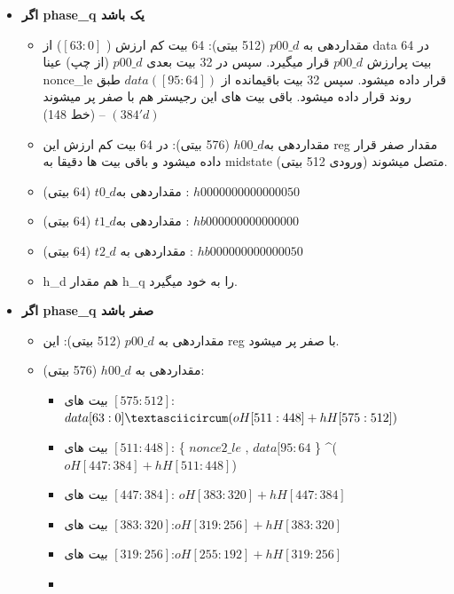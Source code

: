 \begin{itemize}
	\item
	      \textbf{اگر phase\_q یک باشد}
	      \begin{itemize}
	      	\item
	      	      مقداردهی به $p00\_d$ (512 بیتی): 64 بیت کم ارزش ( $[63:0]$) از data در 64 بیت پرارزش $p00\_d$ قرار میگیرد. سپس در 32 بیت بعدی $p00\_d$ (از چپ) عینا nonce\_le قرار داده میشود. سپس 32 بیت باقیمانده از $data ([95:64])$ طبق روند قرار داده میشود. باقی بیت های این رجیستر هم با صفر پر میشوند $(384'd)$ – (خط 148)
	      	\item
	      	      مقداردهی به$ h00\_d$ (576 بیتی): در 64 بیت کم ارزش این reg مقدار صفر قرار داده میشود و باقی بیت ها دقیقا به midstate (ورودی 512 بیتی) متصل میشوند.
	      	\item
	      	      مقداردهی به$ t0\_d$ (64 بیتی) : $h0000000000000050$
	      	\item
	      	      مقداردهی به$ t1\_d$ (64 بیتی) : $hb000000000000000$
	      	\item
	      	      مقداردهی به $t2\_d$ (64 بیتی) : $hb000000000000050$
	      	\item
	      	      h\_d هم مقدار h\_q را به خود میگیرد.
	      \end{itemize}
	\item
\textbf{	      اگر phase\_q صفر باشد
}	      \begin{itemize}
	      	\item
	      	      مقداردهی به $p00\_d$ (512 بیتی): این reg با صفر پر میشود.
	      	\item
	      	      مقداردهی به $h00\_d$ (576 بیتی):
	      	      \begin{itemize}
	      	      	\item
	      	      	      بیت های $[575:512]$:	
	      	      	      	$data[63:0] \textasciicircum ( oH[511:448] + hH[575:512])$
	      	      	\item
	      	      	      بیت های $[511:448]$: 
	      	      	      	\{ $nonce2\_le$ , $data[95:64$ \} \textasciicircum ( $oH[447:384] + hH[511:448]$)
	      	      	\item
	      	      	      بیت های $[447:384]$:  $	oH[383:320] + hH[447:384]$
	      	      	\item
	      	      	      بیت های $[383:320]$:$	oH[319:256] + hH[383:320]$
	      	      	\item
	      	      	      بیت های $[319:256]$:$	oH[255:192] + hH[319:256]$
	      	      	\item

\end{itemize}
\end{itemize}
\end{itemize}
